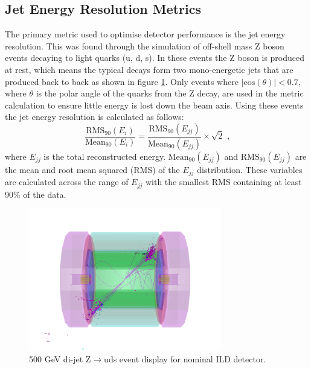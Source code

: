 \subsection{Jet Energy Resolution Metrics}
The primary metric used to optimise detector performance is the jet energy resolution.  This was found through the simulation of off-shell mass Z boson events decaying to light quarks (u, d, s).  In these events the Z boson is produced at rest, which means the typical decays form two mono-energetic jets that are produced back to back as shown in figure \ref{fig:500GeVzudsevtdisplay}.  Only events where $|\text{cos}(\theta)| < 0.7$, where $\theta$ is the polar angle of the quarks from the Z decay, are used in the metric calculation to ensure little energy is lost down the beam axis.  Using these events the jet energy resolution is calculated as follows: 
\begin{equation} 
\frac{\text{RMS}_{90}(E_{i})}{\text{Mean}_{90}(E_{i})} = \frac{\text{RMS}_{90}(E_{jj})}{\text{Mean}_{90}(E_{jj})} \times \sqrt{2} \text{ ,}
\end{equation}
\noindent where $E_{jj}$ is the total reconstructed energy.  $\text{Mean}_{90}(E_{jj})$ and $\text{RMS}_{90}(E_{jj})$ are the mean and root mean squared (RMS) of the $E_{jj}$ distribution.  These variables are calculated across the range of $E_{jj}$ with the smallest RMS containing at least 90\% of the data.  

\begin{figure}[h!]
\centering
\includegraphics[width=0.75\textwidth]{OptimisationStudies/Plots/MethodDescription/500GeVEvent.png}
\caption[500 GeV di-jet Z$\rightarrow$uds event display for nominal ILD detector.]{500 GeV di-jet Z$\rightarrow$uds event display for nominal ILD detector.}
\label{fig:500GeVzudsevtdisplay}
\end{figure} 

